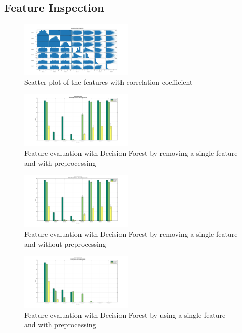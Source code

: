 \documentclass[journal]{IEEEtran}
\begin{document}
\subsection{Feature Inspection}

\begin{figure}\label{scatterplot}
	\centering
	\includegraphics[width=0.48\textwidth]{images/ScatterPlotMatrix}
	\caption{Scatter plot of the features with correlation coefficient}
\end{figure}

\begin{figure}\label{DF_FeatEval_WSF_PP}
	\centering
	\includegraphics[width=0.48\textwidth]{images/DF_FeatEval_WSF_PP}
	\caption{Feature evaluation with Decision Forest by removing a single feature and with preprocessing}
\end{figure}

\begin{figure}\label{DF_FeatEval_WSF_NPP}
	\centering
	\includegraphics[width=0.48\textwidth]{images/DF_FeatEval_WSF_NPP}
	\caption{Feature evaluation with Decision Forest by removing a single feature and without preprocessing}
\end{figure}

\begin{figure}\label{DF_FeatEval_SF_PP}
	\centering
	\includegraphics[width=0.48\textwidth]{images/DF_FeatEval_SF_PP}
	\caption{Feature evaluation with Decision Forest by using a single feature and with preprocessing }
\end{figure}
\end{document}
